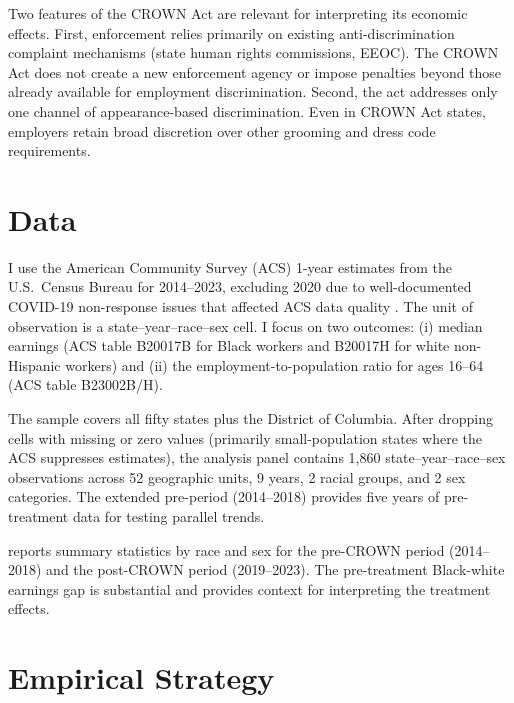 \documentclass[12pt]{article}
\begin{document}
Two features of the CROWN Act are relevant for interpreting its economic effects. First, enforcement relies primarily on existing anti-discrimination complaint mechanisms (state human rights commissions, EEOC). The CROWN Act does not create a new enforcement agency or impose penalties beyond those already available for employment discrimination. Second, the act addresses only one channel of appearance-based discrimination. Even in CROWN Act states, employers retain broad discretion over other grooming and dress code requirements.


\section{Data}
\label{sec:data}

I use the American Community Survey (ACS) 1-year estimates from the U.S.\ Census Bureau for 2014--2023, excluding 2020 due to well-documented COVID-19 non-response issues that affected ACS data quality \citep{census_2020_note}. The unit of observation is a state--year--race--sex cell. I focus on two outcomes: (i) median earnings (ACS table B20017B for Black workers and B20017H for white non-Hispanic workers) and (ii) the employment-to-population ratio for ages 16--64 (ACS table B23002B/H).

The sample covers all fifty states plus the District of Columbia. After dropping cells with missing or zero values (primarily small-population states where the ACS suppresses estimates), the analysis panel contains 1,860 state--year--race--sex observations across 52 geographic units, 9 years, 2 racial groups, and 2 sex categories. The extended pre-period (2014--2018) provides five years of pre-treatment data for testing parallel trends.



 reports summary statistics by race and sex for the pre-CROWN period (2014--2018) and the post-CROWN period (2019--2023). The pre-treatment Black-white earnings gap is substantial and provides context for interpreting the treatment effects.


\section{Empirical Strategy}
\label{sec:strategy}
\end{document}
